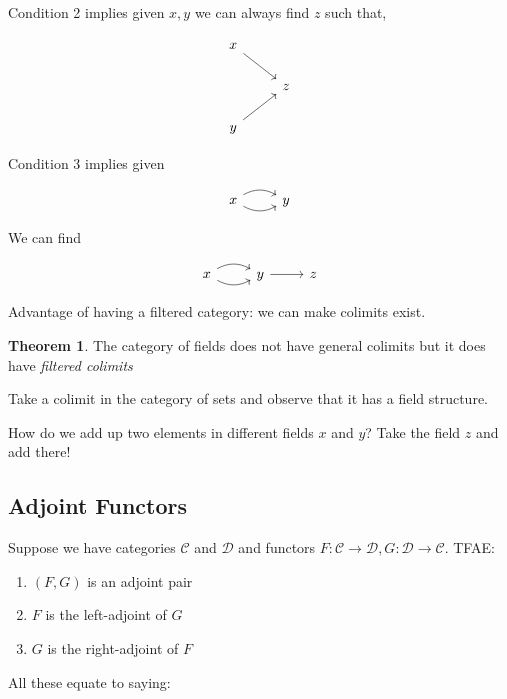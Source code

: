 \documentclass{article}
\theoremstyle{definition}
\newtheorem{theorem}{Theorem}
\begin{document}
    Condition 2 implies given \(x,y\) we can always find \(z\) such that,

    \[
        \begin{tikzcd}
            x \ar[rd] \\ & z \\ y \ar[ru]
        \end{tikzcd}
    \]

    Condition 3 implies given

    \[
        \begin{tikzcd}
            x \ar[r, bend right] \ar[r, bend left] & y
        \end{tikzcd}
    \]

    We can find

    \[
        \begin{tikzcd}
            x \ar[r, bend right] \ar[r, bend left] & y \ar[r] & z
        \end{tikzcd}
    \]

    Advantage of having a filtered category: we can make colimits exist.

    \begin{theorem}
        The category of fields does not have general colimits but it does have \textit{filtered colimits}
    \end{theorem}

    Take a colimit in the category of sets and observe that it has a field structure.

    How do we add up two elements in different fields \(x\) and \(y\)? Take the field \(z\) and add there!

    \subsection*{Adjoint Functors}

    Suppose we have categories \(\mathcal{C}\) and \(\mathcal{D}\) and functors \(F: \mathcal{C} \to \mathcal{D}, G: \mathcal{D} \to \mathcal{C}\). TFAE:
  
    \begin{enumerate}[label=\arabic*)]
        \item \((F,G)\) is an adjoint pair
        \item \(F\) is the left-adjoint of \(G\)
        \item \(G\) is the right-adjoint of \(F\)
    \end{enumerate} 

    All these equate to saying:
\end{document}
